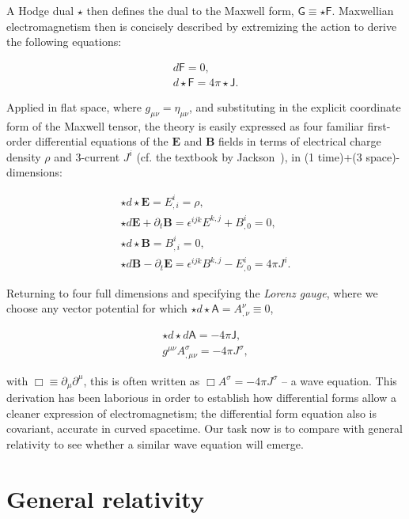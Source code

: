 A Hodge dual $\star$ then defines the dual to the Maxwell form, $\textsf{G} \equiv \star \textsf{F}$. 
Maxwellian electromagnetism then is concisely described by extremizing the action to derive the following equations:

\begin{eqnarray}
d \textsf{F} = 0,\\
d \star \textsf{F} = 4 \pi \star \textsf{J}.
\end{eqnarray}  

Applied in flat space, where $g_{\mu \nu} = \eta_{\mu \nu}$, and substituting in the explicit coordinate form of the Maxwell tensor, the theory is easily expressed as four familiar first-order differential equations of the $\textbf{E}$ and $\textbf{B}$ fields in terms of electrical charge density $\rho$ and 3-current $J^i$ (cf. the textbook by Jackson~\cite{JacksonEM}), in (1 time)+(3 space)-dimensions:
 

\begin{eqnarray}
\star d \star \textbf{E} = E^i_{,i} = \rho,\\
\star d \textbf{E} + \partial_t \textbf{B} = \epsilon^{ijk} E^{k,j} + B^i_{,0} = 0,\\
\star d \star \textbf{B} = B^i_{,i} = 0,\\
\star d \textbf{B} - \partial_t \textbf{E} = \epsilon^{ijk} B^{k,j} - E^i_{,0} = 4 \pi J^i.
\end{eqnarray}

Returning to four full dimensions and specifying the \textit{Lorenz gauge}, where we choose any vector potential for which $\star d \star \textsf{A} = A^\nu_{,\nu} \equiv 0$, 

\begin{eqnarray}
\star d \star d \textsf{A} = -4\pi \textsf{J},\\
g^{\mu\nu}A^\sigma_{,\mu\nu} = -4\pi J^\sigma,
\end{eqnarray}
        
\noindent with $\Box \equiv \partial_\mu \partial^\mu$, this is often written as $\Box A^\sigma = -4 \pi J^\sigma$ -- a wave equation. 
This derivation has been laborious in order to establish how differential forms allow a cleaner expression of electromagnetism; the differential form equation also is covariant, accurate in curved spacetime.
Our task now is to compare with general relativity to see whether a similar wave equation will emerge.

    \section{General relativity}
    \label{general_relativity}

